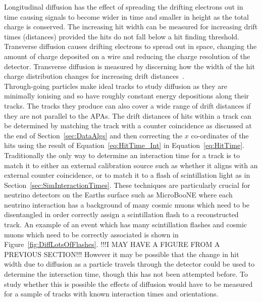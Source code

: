 Longitudinal diffusion has the effect of spreading the drifting electrons out in time causing signals to become wider in time and smaller in height as the total charge is conserved. The increasing hit width can be measured for increasing drift times (distances) provided the hits do not fall below a hit finding threshold. Transverse diffusion causes drifting electrons to spread out in space, changing the amount of charge deposited on a wire and reducing the charge resolution of the detector. Transverse diffusion is measured by discerning how the width of the hit charge distribution changes for increasing drift distances~\citep{DomSeptMeeting}. \\

Through-going particles make ideal tracks to study diffusion as they are minimally ionising and so have roughly constant energy depositions along their tracks. The tracks they produce can also cover a wide range of drift distances if they are not parallel to the APAs. The drift distances of hits within a track can be determined by matching the track with a counter coincidence as discussed at the end of Section~\ref{sec:DataAlgs} and then correcting the $x$ co-ordinates of the hits using the result of Equation~\ref{eq:HitTime_Int} in Equation~\ref{eq:HitTime}. \\

Traditionally the only way to determine an interaction time for a track is to match it to either an external calibration source such as whether it aligns with an external counter coincidence, or to match it to a flash of scintillation light as in Section~\ref{sec:SimInteractionTimes}. These techniques are particularly crucial for neutrino detectors on the Earths surface such as MicroBooNE where each neutrino interaction has a background of many cosmic muons which need to be disentangled in order correctly assign a scintillation flash to a reconstructed track. An example of an event which has many scintillation flashes and cosmic muons which need to be correctly associated is shown in Figure~\ref{fig:DiffLotsOfFlashes}. !!!I MAY HAVE A FIGURE FROM A PREVIOUS SECTION!!! However it may be possible that the change in hit width due to diffusion as a particle travels through the detector could be used to determine the interaction time, though this has not been attempted before. To study whether this is possible the effects of diffusion would have to be measured for a sample of tracks with known interaction times and orientations. \\

